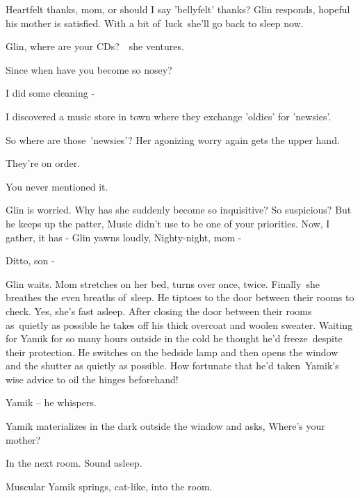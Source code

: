 \documentclass[letterpaper]{article}
\begin{document}
{\textquotedbl}Heartfelt thanks, mom, or should I say 'bellyfelt' thanks?{\textquotedbl} Glin responds, hopeful his
mother is satisfied. With a bit of\ luck\ she'll go back to sleep now.

{\textquotedbl}Glin, where are your CDs?{\textquotedbl}\ \ she ventures.

{\textquotedbl}Since when have you become so nosey?{\textquotedbl} 

{\textquotedbl}I did some cleaning -{\textquotedbl} 

{\textquotedbl}I discovered a music store in town where they exchange {}'oldies{}' for {}'newsies{}'.{\textquotedbl} 

{\textquotedbl}So where are those\ {}'newsies{}'?{\textquotedbl} Her agonizing worry again gets the upper hand.

{\textquotedbl}They're on order.{\textquotedbl} 

{\textquotedbl}You never mentioned it.{\textquotedbl} 

Glin is worried. Why has she suddenly become so inquisitive? So suspicious? But he keeps up the patter,
{\textquotedbl}Music didn't use to be one of your priorities. Now, I gather, it has -{\textquotedbl} Glin yawns
loudly\textcolor[rgb]{0.0,0.4392157,0.7529412}{,} {\textquotedbl}Nighty-night, mom -{\textquotedbl} 

{\textquotedbl}Ditto, son -{\textquotedbl}

Glin waits. Mom stretches on her bed, turns over once, twice. Finally\ she breathes the even breaths of~sleep. He
tiptoes to the door between their rooms to check. Yes, she's fast asleep. After closing the door between their rooms
as~quietly as possible he takes off his thick overcoat and woolen sweater. Waiting for Yamik for so many hours outside
in the cold he thought he'd freeze\ despite their protection. He switches on the bedside lamp and then opens the window
and the shutter as quietly as possible. How fortunate that h\textcolor[rgb]{0.0,0.4392157,0.7529412}{e}{}'d
taken\textcolor[rgb]{0.0,0.4392157,0.7529412}{\ }Yamik's wise advice to oil the hinges beforehand!

 {\textquotedbl}Yamik --{\textquotedbl} he whispers.

Yamik materializes in the dark outside the window and asks, {\textquotedbl}Where's your mother?{\textquotedbl} 

{\textquotedbl}In the next room. Sound asleep.{\textquotedbl} 

Muscular Yamik springs, cat-like, into the room. 
\end{document}
